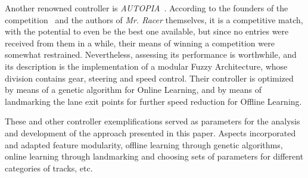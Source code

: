 		Another renowned controller is \emph{AUTOPIA}~\cite{AUTOPIA}. According to the founders of the
		competition~\cite{SoA} and the authors of \emph{Mr. Racer} themselves, it is a competitive match, with the
		potential to even be the best one available, but since no entries were received from them in a while, their
		means of winning a competition were somewhat restrained. Nevertheless, assessing its performance is
		worthwhile, and its description is the implementation of a modular Fuzzy Architecture, whose division contains
		gear, steering and speed control. Their controller is optimized by means of a genetic algorithm for Online
		Learning, and by means of landmarking the lane exit points for further speed reduction for Offline Learning.
		
		
		These and other controller exemplifications served as parameters for the analysis and development of the
		approach presented in this paper. Aspects incorporated and adapted feature modularity, offline learning
		through genetic algorithms, online learning through landmarking and choosing sets of parameters for different
		categories of tracks, etc. 